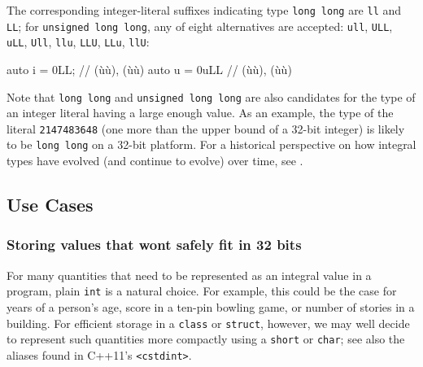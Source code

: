 The corresponding integer-literal suffixes indicating type
\lstinline!long!~\lstinline!long! are \lstinline!ll! and \lstinline!LL!; for
\lstinline!unsigned!~\lstinline!long!~\lstinline!long!, any of eight alternatives
are accepted: \lstinline!ull!, \lstinline!ULL!, \lstinline!uLL!, \lstinline!Ull!,
\lstinline!llu!, \lstinline!LLU!, \lstinline!LLu!,
\lstinline!llU!:

\begin{emcppslisting}[language=C++]
auto i = 0LL;  // (ù{}ù), (ù{}ù)
auto u = 0uLL  // (ù{}ù), (ù{}ù)
\end{emcppslisting}
    
\noindent Note that \lstinline!long!~\lstinline!long!
and \lstinline!unsigned!~\lstinline!long!~\lstinline!long! are also candidates
for the type of an integer literal having a large enough value. As an
example, the type of the literal \lstinline!2147483648! (one more than
the upper bound of a 32-bit integer) is likely to be
  \lstinline!long!~\lstinline!long! on a 32-bit platform. For a historical perspective on how integral types have evolved (and
continue to evolve) over time, see .

\subsection[Use Cases]{Use Cases}\label{use-cases}

\subsubsection[Storing values that won't safely fit in 32 bits]{Storing values that won{\subsubapos}t safely fit in 32 bits}\label{when-your-pedestrian-four-byte-int-might-not-cut-it}\label{Storing-values-that-won't-safely-fit-in-32-bits}

For many quantities that need to be represented as an integral value in a program, plain \lstinline!int! is a natural choice. For example, this could be the case for years of a person's age, score in a ten-pin bowling game, or number of stories in a building. For efficient storage in a \lstinline!class!
or \lstinline!struct!, however, we may well decide to represent such
quantities more compactly using a \lstinline!short! or \lstinline!char!; see
  also the aliases found in C++11's \lstinline!<cstdint>!. 
  
